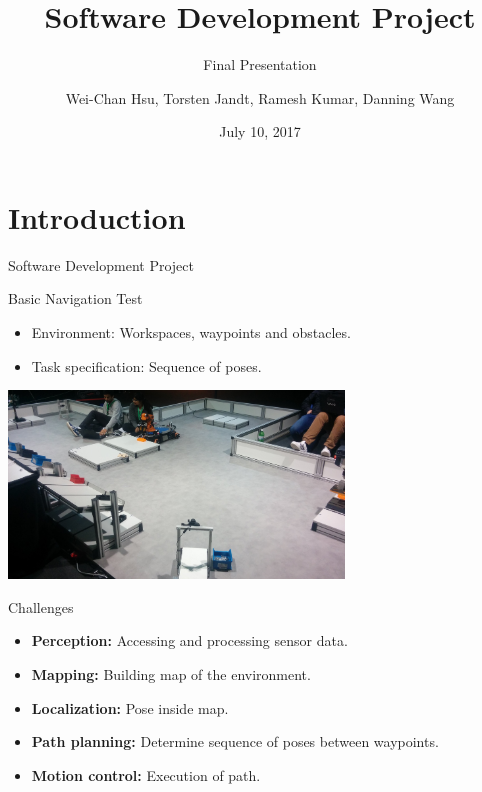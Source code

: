\documentclass[12pt,aspectratio=43,xcolor={usenames,dvipsnames,table}]{beamer}
\title{Software Development Project}
\subtitle{Final Presentation}
\author{Wei-Chan Hsu, Torsten Jandt, Ramesh Kumar, Danning Wang}
\date{July 10, 2017}
\begin{document}
\begin{frame}
\titlepage
\end{frame}

\section{Introduction}
\begin{frame}{Software Development Project}
\end{frame}

\begin{frame}{Basic Navigation Test}
\begin{itemize}
    \item Environment: Workspaces, waypoints and obstacles.
    \item Task specification: Sequence of poses.
\end{itemize}
\centering \includegraphics[height=50mm]{gfx/arena.jpg}
\end{frame}

\begin{frame}{Challenges}
\begin{itemize}
    \item \textbf{Perception:} Accessing and processing sensor data.
    \item \textbf{Mapping:} Building map of the environment.
    \item \textbf{Localization:} Pose inside map.
    \item \textbf{Path planning:} Determine sequence of poses between waypoints.
    \item \textbf{Motion control:} Execution of path.
\end{itemize}
\end{frame}
\end{document}
